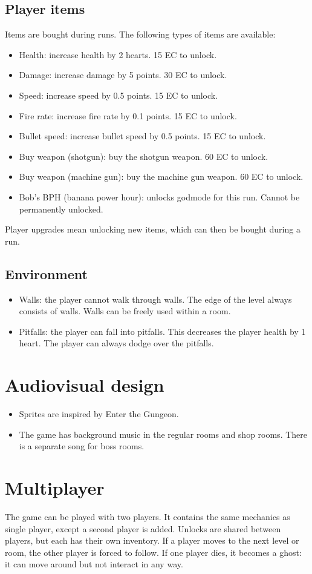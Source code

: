 \documentclass{article}
\begin{document}
\subsection{Player items}
Items are bought during runs. The following types of items are available:
\begin{itemize}
    \item Health: increase health by 2 hearts. 15 EC to unlock.
    \item Damage: increase damage by 5 points. 30 EC to unlock.
    \item Speed: increase speed by 0.5 points. 15 EC to unlock.
    \item Fire rate: increase fire rate by 0.1 points. 15 EC to unlock.
    \item Bullet speed: increase bullet speed by 0.5 points. 15 EC to unlock.
    \item Buy weapon (shotgun): buy the shotgun weapon. 60 EC to unlock.
    \item Buy weapon (machine gun): buy the machine gun weapon. 60 EC to unlock.
    \item Bob's BPH (banana power hour): unlocks godmode for this run. Cannot be permanently unlocked.
\end{itemize}

Player upgrades mean unlocking new items, which can then be bought during a run.

\subsection{Environment}
\begin{itemize}
    \item Walls: the player cannot walk through walls. The edge of the level always consists of walls. Walls can be freely used within a room.
    \item Pitfalls: the player can fall into pitfalls. This decreases the player health by 1 heart. The player can always dodge over the pitfalls.
\end{itemize}

\section{Audiovisual design}
\begin{itemize}
    \item Sprites are inspired by Enter the Gungeon.
    \item The game has background music in the regular rooms and shop rooms. There is a separate song for boss rooms.
\end{itemize}

\section{Multiplayer}
The game can be played with two players. It contains the same mechanics as single player, except a second player is added.
Unlocks are shared between players, but each has their own inventory.
If a player moves to the next level or room, the other player is forced to follow.
If one player dies, it becomes a ghost: it can move around but not interact in any way.
\end{document}
